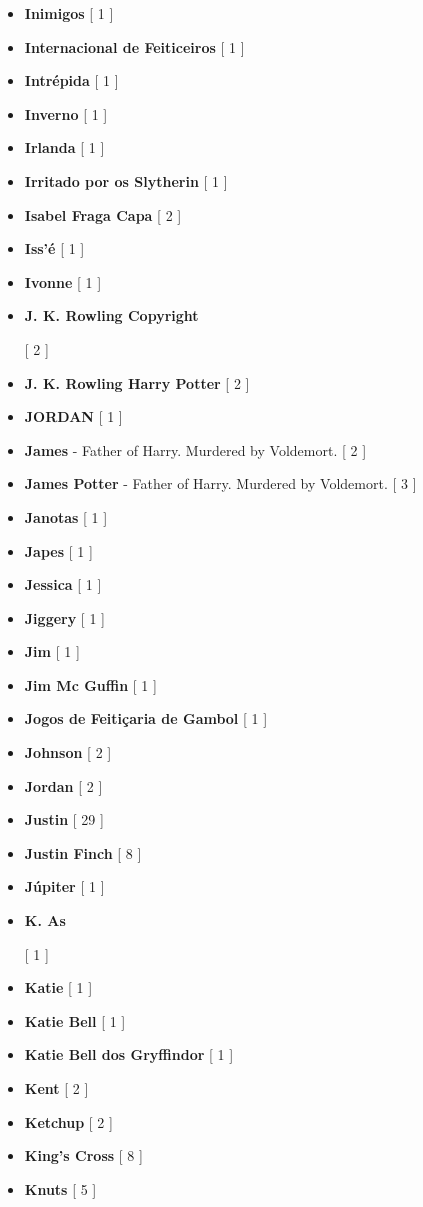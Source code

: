 \documentclass[a4paper]{article}
\begin{document}
{\begin{itemize}
	\item \textbf{Inimigos} [ 1 ]
	\item \textbf{Internacional de Feiticeiros} [ 1 ]
	\item \textbf{Intrépida} [ 1 ]
	\item \textbf{Inverno} [ 1 ]
	\item \textbf{Irlanda} [ 1 ]
	\item \textbf{Irritado por os Slytherin} [ 1 ]
	\item \textbf{Isabel Fraga Capa} [ 2 ]
	\item \textbf{Iss'é} [ 1 ]
	\item \textbf{Ivonne} [ 1 ]
	\item \hypertarget{J}{\textbf{J. K. Rowling Copyright}} [ 2 ]
	\item \textbf{J. K. Rowling Harry Potter} [ 2 ]
	\item \textbf{JORDAN} [ 1 ]
	\item \textbf{James} - Father of Harry. Murdered by Voldemort. [ 2 ]
	\item \textbf{James Potter} - Father of Harry. Murdered by Voldemort. [ 3 ]
	\item \textbf{Janotas} [ 1 ]
	\item \textbf{Japes} [ 1 ]
	\item \textbf{Jessica} [ 1 ]
	\item \textbf{Jiggery} [ 1 ]
	\item \textbf{Jim} [ 1 ]
	\item \textbf{Jim Mc Guffin} [ 1 ]
	\item \textbf{Jogos de Feitiçaria de Gambol} [ 1 ]
	\item \textbf{Johnson} [ 2 ]
	\item \textbf{Jordan} [ 2 ]
	\item \textbf{Justin} [ 29 ]
	\item \textbf{Justin Finch} [ 8 ]
	\item \textbf{Júpiter} [ 1 ]
	\item \hypertarget{K}{\textbf{K. As}} [ 1 ]
	\item \textbf{Katie} [ 1 ]
	\item \textbf{Katie Bell} [ 1 ]
	\item \textbf{Katie Bell dos Gryffindor} [ 1 ]
	\item \textbf{Kent} [ 2 ]
	\item \textbf{Ketchup} [ 2 ]
	\item \textbf{King's Cross} [ 8 ]
	\item \textbf{Knuts} [ 5 ]

\end{itemize}}
\end{document}
